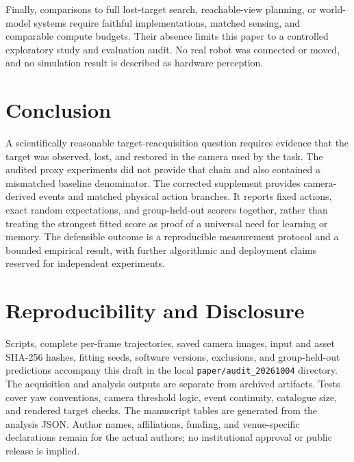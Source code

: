 \documentclass[10pt,twocolumn,a4paper]{article}
\begin{document}
Finally, comparisons to full lost-target search, reachable-view planning, or world-model systems require faithful implementations, matched sensing, and comparable compute budgets. Their absence limits this paper to a controlled exploratory study and evaluation audit. No real robot was connected or moved, and no simulation result is described as hardware perception.

\section{Conclusion}
A scientifically reasonable target-reacquisition question requires evidence that the target was observed, lost, and restored in the camera used by the task. The audited proxy experiments did not provide that chain and also contained a mismatched baseline denominator. The corrected supplement provides camera-derived events and matched physical action branches. It reports fixed actions, exact random expectations, and group-held-out scorers together, rather than treating the strongest fitted score as proof of a universal need for learning or memory. The defensible outcome is a reproducible measurement protocol and a bounded empirical result, with further algorithmic and deployment claims reserved for independent experiments.

\section*{Reproducibility and Disclosure}
Scripts, complete per-frame trajectories, saved camera images, input and asset SHA-256 hashes, fitting seeds, software versions, exclusions, and group-held-out predictions accompany this draft in the local \texttt{paper/audit\_20261004} directory. The acquisition and analysis outputs are separate from archived artifacts. Tests cover yaw conventions, camera threshold logic, event continuity, catalogue size, and rendered target checks. The manuscript tables are generated from the analysis JSON. Author names, affiliations, funding, and venue-specific declarations remain for the actual authors; no institutional approval or public release is implied.
\end{document}
